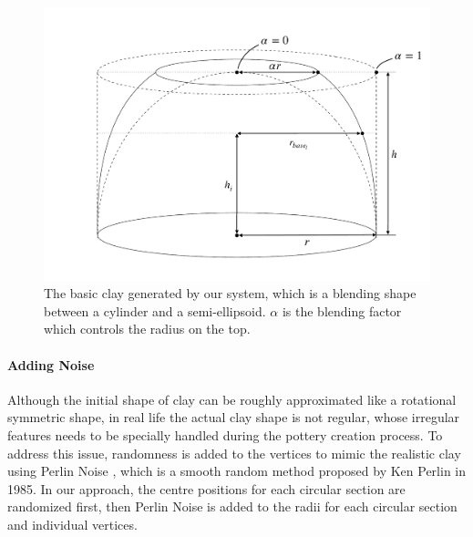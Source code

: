 \documentclass{svjour3}                     %
\begin{document}
\begin{figure}
\includegraphics[width=\textwidth]{fig3.pdf}
\caption{The basic clay generated by our system, which is a blending shape between a cylinder and a semi-ellipsoid. $\alpha$ is the blending factor which controls the radius on the top.}
\label{fig:base}
\end{figure}

\paragraph{Adding Noise} Although the initial shape of clay can be roughly approximated like a rotational symmetric shape, in real life the actual clay shape is not regular, whose irregular features needs to be specially handled during the pottery creation process. To address this issue, randomness is added to the vertices to mimic the realistic clay using Perlin Noise \cite{Perlin1985An}, which is a smooth random method proposed by Ken Perlin in 1985.
In our approach, the centre positions for each circular section are randomized first, then Perlin Noise is added to the radii for each circular section and individual vertices.
\end{document}
